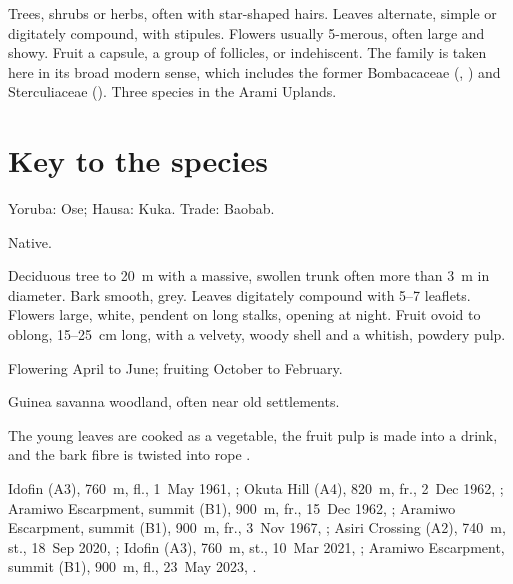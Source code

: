 \label{fam:malvaceae}

Trees, shrubs or herbs, often with star-shaped hairs. Leaves
alternate, simple or digitately compound, with stipules. Flowers
usually 5-merous, often large and showy. Fruit a capsule, a group of
follicles, or indehiscent. The family is taken here in its broad
modern sense, which includes the former Bombacaceae
(, ) and Sterculiaceae ().
Three species in the Arami Uplands.

\section*{Key to the species}
\begin{florakey}
\end{florakey}

\label{sp:MAL01}

 Yoruba: Ose; Hausa: Kuka. Trade:
Baobab.

 Native.

 Deciduous tree to 20~m with a massive, swollen
trunk often more than 3~m in diameter. Bark smooth, grey. Leaves
digitately compound with 5--7 leaflets. Flowers large, white, pendent
on long stalks, opening at night. Fruit ovoid to oblong, 15--25~cm
long, with a velvety, woody shell and a whitish, powdery pulp.

 Flowering April to June; fruiting October to
February.

 Guinea savanna woodland, often near old settlements.

 The young leaves are cooked as a vegetable, the fruit
pulp is made into a drink, and the bark fibre is twisted into rope
\citep{burkill1985,arbonnier2004}.

 Idofin (A3), 760~m, fl., 1~May 1961, ;
Okuta Hill (A4), 820~m, fr., 2~Dec 1962, ;
Aramiwo Escarpment, summit (B1), 900~m, fr., 15~Dec 1962, ;
Aramiwo Escarpment, summit (B1), 900~m, fr., 3~Nov 1967, ;
Asiri Crossing (A2), 740~m, st., 18~Sep 2020, ;
Idofin (A3), 760~m, st., 10~Mar 2021, ;
Aramiwo Escarpment, summit (B1), 900~m, fl., 23~May 2023, .

